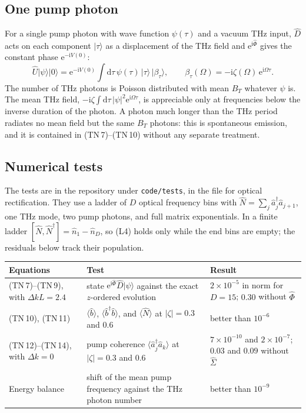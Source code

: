 \documentclass[aps,pra,onecolumn,notitlepage,11pt,amsmath,amssymb,nofootinbib]{revtex4-2}
\newcommand{\Nop}{\hat N}
\newcommand{\dd}{\mathrm{d}}
\newcommand{\ee}{\mathrm{e}}
\newcommand{\ii}{\mathrm{i}}
\begin{document}
\subsection{One pump photon}

For a single pump photon with wave function $\psi(\tau)$ and a vacuum THz
input, $\hat D$ acts on each component $|\tau\rangle$ as a displacement of the
THz field and $\ee^{\ii\hat\Phi}$ gives the constant phase $\ee^{-\ii V(0)}$:
\begin{equation}
\hat U|\psi\rangle|0\rangle=\ee^{-\ii V(0)}\int\!\dd\tau\,\psi(\tau)\,|\tau\rangle\,|\beta_\tau\rangle,
\qquad\beta_\tau(\Omega)=-\ii\zeta(\Omega)\,\ee^{\ii\Omega\tau}.
\end{equation}
The number of THz photons is Poisson distributed with mean $B_T$ whatever
$\psi$ is. The mean THz field, $-\ii\zeta\int\dd\tau\,|\psi|^2\ee^{\ii\Omega\tau}$,
is appreciable only at frequencies below the inverse duration of the photon.
A photon much longer than the THz period radiates no mean field but the same
$B_T$ photons: this is spontaneous emission, and it is contained in
(TN\,7)--(TN\,10) without any separate treatment.

\subsection{Numerical tests}

The tests are in the repository under \texttt{code/tests}, in the file for
optical rectification. They use a ladder of $D$ optical frequency bins with
$\Nop=\sum_j\hat a_j^\dagger\hat a_{j+1}$, one THz mode, two pump photons, and
full matrix exponentials. In a finite ladder
$[\Nop,\Nop^\dagger]=\hat n_1-\hat n_D$, so (L4) holds only while the end bins
are empty; the residuals below track their population.

\begin{center}
\begin{tabular}{R{0.24\textwidth}R{0.38\textwidth}R{0.30\textwidth}}
\hline\hline
Equations & Test & Result\\
\hline
(TN\,7)--(TN\,9), with $\Delta kL=2.4$ & state $\ee^{\ii\hat\Phi}\hat D|\psi\rangle$ against the exact $z$-ordered evolution &
 $2\times10^{-5}$ in norm for $D=15$; $0.30$ without $\hat\Phi$\\[4pt]
(TN\,10), (TN\,11) & $\langle\hat b\rangle$, $\langle\hat b^\dagger\hat b\rangle$, and $\langle\Nop\rangle$ at $|\zeta|=0.3$ and $0.6$ &
 better than $10^{-6}$\\[4pt]
(TN\,12)--(TN\,14), with $\Delta k=0$ & pump coherence $\langle\hat a_j^\dagger\hat a_k\rangle$ at $|\zeta|=0.3$ and $0.6$ &
 $7\times10^{-10}$ and $2\times10^{-7}$; $0.03$ and $0.09$ without $\hat\Sigma$\\[4pt]
Energy balance & shift of the mean pump frequency against the THz photon number &
 better than $10^{-9}$\\
\hline\hline
\end{tabular}
\end{center}
\end{document}
